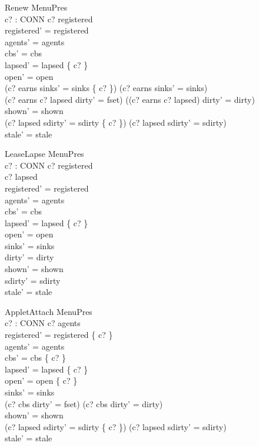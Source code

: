 \documentclass[a4paper,10pt,fleqn]{article}
\begin{document}
\begin{schema}{Renew}
  \Delta MenuPres \\
  c? : CONN
\where
  c? \in registered \\
  registered' = registered \\
  agents' = agents \\
  cbs' = cbs \\
  lapsed' = lapsed \setminus \{ c? \} \\
  open' = open \\
  (c? \in earns \land sinks' = sinks \oplus \{ c?  \}) \lor
    (c? \notin earns \land sinks' = sinks) \\
  (c? \in earns \land c? \in lapsed \land dirty' = fset) \lor
    (\lnot (c? \in earns \land c? \in lapsed) \land dirty' = dirty) \\
  shown' = shown \\
  (c? \in lapsed \land sdirty' = sdirty \cup \{ c? \}) \lor
    (c? \notin lapsed \land sdirty' = sdirty) \\
  stale' = stale
\end{schema}

\begin{schema}{LeaseLapse}
  \Delta MenuPres \\
  c? : CONN
\where
  c? \in registered \\
  c? \notin lapsed \\
  registered' = registered \\
  agents' = agents \\
  cbs' = cbs \\
  lapsed' = lapsed \cup \{ c? \} \\
  open' = open \\
  sinks' = sinks \\
  dirty' = dirty \\
  shown' = shown \\
  sdirty' = sdirty \\
  stale' = stale
\end{schema}

\begin{schema}{AppletAttach}
  \Delta MenuPres \\
  c? : CONN
\where
  c? \notin agents \\
  registered' = registered \cup \{ c? \} \\
  agents' = agents \\
  cbs' = cbs \setminus \{ c? \} \\
  lapsed' = lapsed \setminus \{ c? \} \\
  open' = open \cup \{ c? \} \\
  sinks' = sinks \\
  (c? \in cbs \land dirty' = fset) \lor (c? \notin cbs \land dirty' = dirty) \\
  shown' = shown \\
  (c? \in lapsed \land sdirty' = sdirty \cup \{ c? \}) \lor
    (c? \notin lapsed \land sdirty' = sdirty) \\
  stale' = stale
\end{schema}
\end{document}
